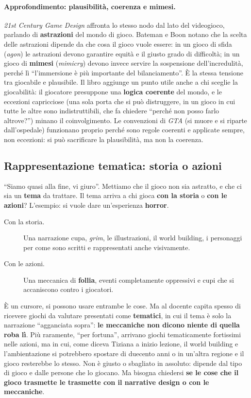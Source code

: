\paragraph{Approfondimento: plausibilità, coerenza e mimesi.} \emph{21st Century
Game Design} affronta lo stesso nodo dal lato del videogioco, parlando di
\textbf{astrazioni} del mondo di gioco. Bateman e Boon notano che la scelta delle
astrazioni dipende da che cosa il gioco vuole essere: in un gioco di sfida
(\emph{agon}) le astrazioni devono garantire equità e il giusto grado di
difficoltà; in un gioco di \textbf{mimesi} (\emph{mimicry}) devono invece servire
la sospensione dell'incredulità, perché lì ``l'immersione è più importante del
bilanciamento''. È la stessa tensione tra giocabile e plausibile. Il libro
aggiunge un punto utile anche a chi sceglie la giocabilità: il giocatore
presuppone una \textbf{logica coerente} del mondo, e le eccezioni capricciose
(una sola porta che si può distruggere, in un gioco in cui tutte le altre sono
indistruttibili, che fa chiedere ``perché non posso farlo altrove?'') minano il
coinvolgimento. Le convenzioni di \emph{GTA} (si muore e si riparte
dall'ospedale) funzionano proprio perché sono regole coerenti e applicate sempre,
non eccezioni: si può sacrificare la plausibilità, ma non la coerenza.

\subsection{Rappresentazione tematica: storia o azioni}
\label{a3:sec:rappresentazione}

``Siamo quasi alla fine, vi giuro''. Mettiamo che il gioco non sia astratto, e
che ci sia un \textbf{tema} da trattare. Il tema arriva a chi gioca
\textbf{con la storia} o \textbf{con le azioni}? L'esempio: si vuole dare
un'esperienza \textbf{horror}.
\begin{description}
  \item[Con la storia.] Una narrazione cupa, \emph{grim}, le illustrazioni, il
        world building, i personaggi per come sono scritti e rappresentati anche
        visivamente.
  \item[Con le azioni.] Una meccanica di \textbf{follia}, eventi completamente
        oppressivi e cupi che si accaniscono contro i giocatori.
\end{description}
È un cursore, si possono usare entrambe le cose. Ma al docente capita spesso di
ricevere giochi da valutare presentati come \textbf{tematici}, in cui il tema è
solo la narrazione ``agganciata sopra'': \textbf{le meccaniche non dicono niente
di quella roba lì}. Più raramente, ``per fortuna'', arrivano giochi tematicamente
fortissimi nelle azioni, ma in cui, come diceva Tiziana a inizio lezione, il world
building e l'ambientazione si potrebbero spostare di duecento anni o in un'altra
regione e il gioco resterebbe lo stesso. Non è giusto o sbagliato in assoluto:
dipende dal tipo di gioco e dalle persone che lo giocano. Ma bisogna chiedersi
\textbf{se le cose che il gioco trasmette le trasmette con il narrative design o
con le meccaniche}.

